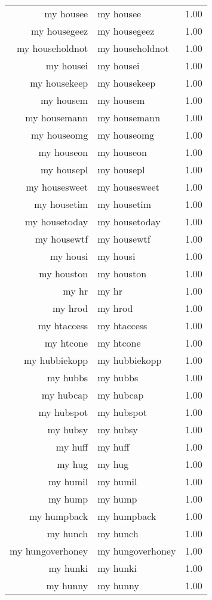 \begin{table}[ht]
\begin{tabular}{rlr}
  my housee & my housee & 1.00 \\ 
  my housegeez & my housegeez & 1.00 \\ 
  my householdnot & my householdnot & 1.00 \\ 
  my housei & my housei & 1.00 \\ 
  my housekeep & my housekeep & 1.00 \\ 
  my housem & my housem & 1.00 \\ 
  my housemann & my housemann & 1.00 \\ 
  my houseomg & my houseomg & 1.00 \\ 
  my houseon & my houseon & 1.00 \\ 
  my housepl & my housepl & 1.00 \\ 
  my housesweet & my housesweet & 1.00 \\ 
  my housetim & my housetim & 1.00 \\ 
  my housetoday & my housetoday & 1.00 \\ 
  my housewtf & my housewtf & 1.00 \\ 
  my housi & my housi & 1.00 \\ 
  my houston & my houston & 1.00 \\ 
  my hr & my hr & 1.00 \\ 
  my hrod & my hrod & 1.00 \\ 
  my htaccess & my htaccess & 1.00 \\ 
  my htcone & my htcone & 1.00 \\ 
  my hubbiekopp & my hubbiekopp & 1.00 \\ 
  my hubbs & my hubbs & 1.00 \\ 
  my hubcap & my hubcap & 1.00 \\ 
  my hubspot & my hubspot & 1.00 \\ 
  my hubsy & my hubsy & 1.00 \\ 
  my huff & my huff & 1.00 \\ 
  my hug & my hug & 1.00 \\ 
  my humil & my humil & 1.00 \\ 
  my hump & my hump & 1.00 \\ 
  my humpback & my humpback & 1.00 \\ 
  my hunch & my hunch & 1.00 \\ 
  my hungoverhoney & my hungoverhoney & 1.00 \\ 
  my hunki & my hunki & 1.00 \\ 
  my hunny & my hunny & 1.00 \\ 

\end{tabular}
\end{table}
